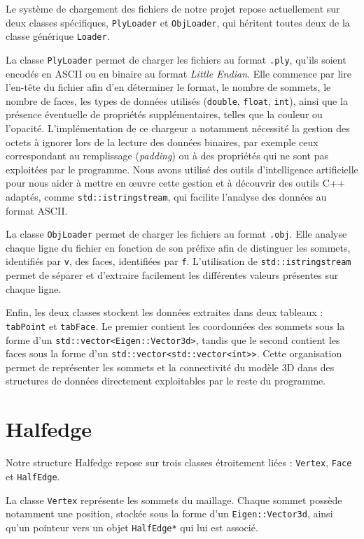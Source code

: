 \documentclass[12pt,a4paper]{article}
\begin{document}
Le système de chargement des fichiers de notre projet repose actuellement sur deux classes spécifiques, \texttt{PlyLoader} et \texttt{ObjLoader}, qui héritent toutes deux de la classe générique \texttt{Loader}.

La classe \texttt{PlyLoader} permet de charger les fichiers au format \texttt{.ply}, qu'ils soient encodés en ASCII ou en binaire au format \textit{Little Endian}. Elle commence par lire l'en-tête du fichier afin d'en déterminer le format, le nombre de sommets, le nombre de faces, les types de données utilisés (\texttt{double}, \texttt{float}, \texttt{int}), ainsi que la présence éventuelle de propriétés supplémentaires, telles que la couleur ou l'opacité. 
L'implémentation de ce chargeur a notamment nécessité la gestion des octets à ignorer lors de la lecture des données binaires, par exemple ceux correspondant au remplissage (\textit{padding}) ou à des propriétés qui ne sont pas exploitées par le programme. Nous avons utilisé des outils d'intelligence artificielle pour nous aider à mettre en œuvre cette gestion et à découvrir des outils C++ adaptés, comme \texttt{std::istringstream}, qui facilite l'analyse des données au format ASCII.

La classe \texttt{ObjLoader} permet de charger les fichiers au format \texttt{.obj}. Elle analyse chaque ligne du fichier en fonction de son préfixe afin de distinguer les sommets, identifiés par \texttt{v}, des faces, identifiées par \texttt{f}. L'utilisation de \texttt{std::istringstream} permet de séparer et d'extraire facilement les différentes valeurs présentes sur chaque ligne.

Enfin, les deux classes stockent les données extraites dans deux tableaux : \texttt{tabPoint} et \texttt{tabFace}. Le premier contient les coordonnées des sommets sous la forme d'un \texttt{std::vector<Eigen::Vector3d>}, tandis que le second contient les faces sous la forme d'un \texttt{std::vector<std::vector<int>>}. Cette organisation permet de représenter les sommets et la connectivité du modèle 3D dans des structures de données directement exploitables par le reste du programme.

\newpage
\section{Halfedge}

Notre structure Halfedge repose sur trois classes étroitement liées : \texttt{Vertex}, \texttt{Face} et \texttt{HalfEdge}.

La classe \texttt{Vertex} représente les sommets du maillage. Chaque sommet possède notamment une position, stockée sous la forme d'un \texttt{Eigen::Vector3d}, ainsi qu'un pointeur vers un objet \texttt{HalfEdge*} qui lui est associé.
\end{document}
